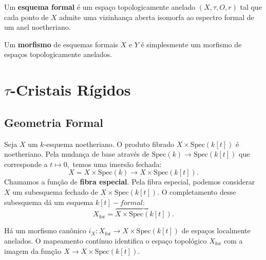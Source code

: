 \documentclass[11pt,twoside,a4paper]{book}
\begin{document}
\begin{definicao}
Um \textbf{esquema formal} é um espaço topologicamente anelado $(X,\tau,O,r)$ tal que cada ponto de $X$ admite uma vizinhança aberta isomorfa ao espectro formal de um anel noetheriano.
\end{definicao}

\begin{definicao}
Um \textbf{morfismo} de esquemas formais $X$ e $Y$ é simplesmente um morfismo de espaços topologicamente anelados.
\end{definicao}

\chapter{$\tau$-Cristais Rígidos}

\section{Geometria Formal}

\begin{definicao}
Seja $X$ um $k$-esquema noetheriano. O produto fibrado $X\times\mathrm{Spec}(k[t])$ é noetheriano. Pela mudança de base através de $\mathrm{Spec}(k)\rightarrow\mathrm{Spec}(k[t])$ que corresponde a $t\mapsto 0,$ temos uma imersão fechada:
\[
X=X\times\mathrm{Spec}(k)\rightarrow X\times\mathrm{Spec}(k[t]).
\]
Chamamos a função de \textbf{fibra especial}. Pela fibra especial, podemos considerar $X$ um subesquema fechado de $X\times\mathrm{Spec}(k[t]).$ O completamento desse subesquema dá um esquema $k[t]-formal$:
\[
X_\mathrm{for}=\overbrace{X\times\mathrm{Spec}(k[t])}.
\]
\end{definicao}

\begin{lema}
Há um morfismo canônico $i_X:X_{\mathrm{for}}\rightarrow X\times\mathrm{Spec}(k[t])$ de espaços localmente anelados. O mapeamento contínuo identifica o espaço topológico $X_\mathrm{for}$ com a imagem da função $X\rightarrow X\times\mathrm{Spec}(k[t]).$
\end{lema}
\end{document}
